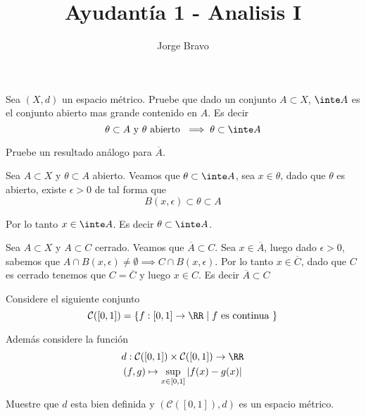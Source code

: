\documentclass[a4paper,oneside,10.5pt]{USMArt}
\title{Ayudantía 1 - Analisis I}
\author{Jorge Bravo}
\begin{document}
\maketitle

\begin{prob}
  Sea $(X, d)$ un espacio métrico. Pruebe que dado un conjunto $A \subset X$, $\inte A$ es el conjunto abierto mas grande contenido en $A$. Es decir
  \begin{equation*}
    \theta \subset A \text{ y } \theta \text{ abierto } \implies \theta \subset \inte A
  \end{equation*}

  Pruebe un resultado análogo para $\overline{A}$.
\end{prob}

\begin{sol}
  Sea $A \subset X$ y $\theta \subset A$ abierto. Veamos que $\theta \subset \inte A$, sea $x \in \theta$, dado que $\theta$ es abierto, existe $\epsilon > 0$ de tal forma que
  \begin{equation*}
    B(x, \epsilon) \subset \theta \subset A
  \end{equation*}

  Por lo tanto $x \in \inte A$. Es decir $\theta \subset \inte A$.
  \newline

  Sea $A \subset X$ y $A \subset C$ cerrado. Veamos que $\overline{A} \subset C$. Sea $x \in \overline{A}$, luego dado $\epsilon > 0$, sabemos que $A \cap B(x, \epsilon) \neq \emptyset \implies C \cap B(x, \epsilon)$. Por lo tanto $x \in \overline{C}$, dado que $C$ es cerrado tenemos que $C = \overline{C}$ y luego $x \in C$.
  Es decir $\overline{A} \subset C$
\end{sol}

\begin{prob}
  Considere el siguiente conjunto
  \begin{equation*}
    \mathcal{C}([0, 1]) = \{f : [0, 1] \to \RR \; | \; f \text{ es continua }\}
  \end{equation*}

  Además considere la función
  \begin{gather*}
    d : \mathcal{C}([0, 1]) \times \mathcal{C}([0, 1]) \to \RR\\
    (f, g) \mapsto \sup_{x \in [0, 1]} |f(x) - g(x)|
  \end{gather*}

  Muestre que $d$ esta bien definida y $(\mathcal{C}([0, 1]), d)$ es un espacio métrico.
\end{prob}
\end{document}
